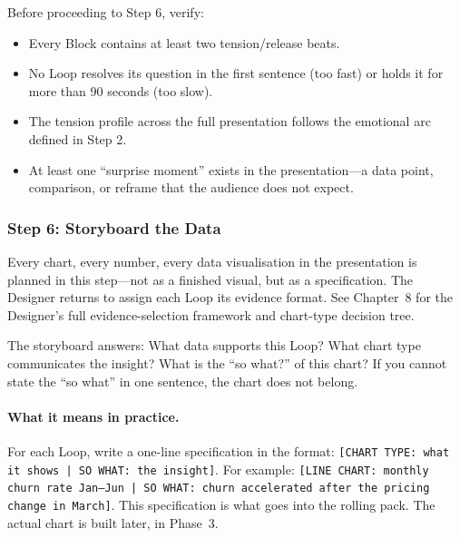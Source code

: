 \begin{keybox}
Before proceeding to Step 6, verify:
\begin{itemize}[leftmargin=1.2em]
  \item Every Block contains at least two tension/release beats.
  \item No Loop resolves its question in the first sentence (too fast) or holds it for more than 90 seconds (too slow).
  \item The tension profile across the full presentation follows the emotional arc defined in Step 2.
  \item At least one ``surprise moment'' exists in the presentation---a data point, comparison, or reframe that the audience does not expect.
\end{itemize}
\end{keybox}

\subsubsection{Step 6: Storyboard the Data}

Every chart, every number, every data visualisation in the presentation is planned in this step---not as a finished visual, but as a specification. The Designer returns to assign each Loop its evidence format. See Chapter~8 for the Designer's full evidence-selection framework and chart-type decision tree.

The storyboard answers: What data supports this Loop? What chart type communicates the insight? What is the ``so what?'' of this chart? If you cannot state the ``so what'' in one sentence, the chart does not belong.

\paragraph{What it means in practice.} For each Loop, write a one-line specification in the format: \texttt{[CHART TYPE: what it shows | SO WHAT: the insight]}. For example: \texttt{[LINE CHART: monthly churn rate Jan--Jun | SO WHAT: churn accelerated after the pricing change in March]}. This specification is what goes into the rolling pack. The actual chart is built later, in Phase~3.

